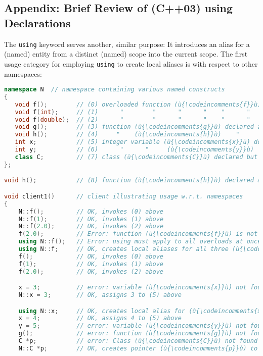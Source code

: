 \subsection[Appendix: Brief Review of (C++03) {\tt using} Declarations]{Appendix: Brief Review of (C++03) {\SubsecCode using} Declarations}\label{appendix:-brief-review-of-(c++03)-using-declarations}

The \texttt{using} keyword serves another, similar purpose: It introduces an
alias for a (named) entity from a distinct (named) scope into the
current scope. The first usage category for employing \texttt{using} to
create local aliases is with respect to other namespaces:

\begin{lstlisting}[language=C++]
namespace N  // namespace containing various named constructs
{
   void f();        // (0) overloaded function (ù{\codeincomments{f}}ù) declared at namespace scope
   void f(int);     // (1)      "        "      "      "    "      "       "
   void f(double);  // (2)      "        "      "      "    "      "       "
   void g();        // (3) function (ù{\codeincomments{g}}ù) declared at namespace scope
   void h();        // (4)     "    (ù{\codeincomments{h}}ù)    "      "     "       "
   int x;           // (5) integer variable (ù{\codeincomments{x}}ù) declared at namespace scope
   int y;           // (6)      "      "     (ù{\codeincomments{y}}ù)     "     "     "      "
   class C;         // (7) class (ù{\codeincomments{C}}ù) declared but not defined at namespace scope
};

void h();           // (8) function (ù{\codeincomments{h}}ù) declared at file (aka global) scope

void client1()      // client illustrating usage w.r.t. namespaces
{
    N::f();         // OK, invokes (0) above
    N::f(1);        // OK, invokes (1) above
    N::f(2.0);      // OK, invokes (2) above
    f(2.0);         // Error: function (ù{\codeincomments{f}}ù) is not found.
    using N::f();   // Error: using must apply to all overloads at once.
    using N::f;     // OK, creates local aliases for all three (ù{\codeincomments{f}}ù) overloads
    f();            // OK, invokes (0) above
    f(1);           // OK, invokes (1) above
    f(2.0);         // OK, invokes (2) above

    x = 3;          // error: variable (ù{\codeincomments{x}}ù) not found
    N::x = 3;       // OK, assigns 3 to (5) above

    using N::x;     // OK, creates local alias for (ù{\codeincomments{x}}ù)
    x = 4;          // OK, assigns 4 to (5) above
    y = 5;          // error: variable (ù{\codeincomments{y}}ù) not found
    g();            // error: function (ù{\codeincomments{g}}ù) not found
    C *p;           // error: Class (ù{\codeincomments{C}}ù) not found
    N::C *p;        // OK, creates pointer (ù{\codeincomments{p}}ù) to incomplete type (ù{\codeincomments{C}}ù) (8) above


\end{lstlisting}
